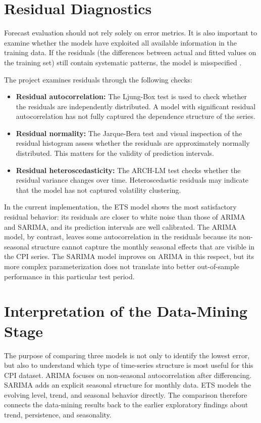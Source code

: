 \section{Residual Diagnostics}

Forecast evaluation should not rely solely on error metrics. It is also important to examine whether the models have exploited all available information in the training data. If the residuals (the differences between actual and fitted values on the training set) still contain systematic patterns, the model is misspecified \cite{Box2015,Hyndman2021}.

The project examines residuals through the following checks:

\begin{itemize}
	\item \textbf{Residual autocorrelation:} The Ljung-Box test is used to check whether the residuals are independently distributed. A model with significant residual autocorrelation has not fully captured the dependence structure of the series.
	\item \textbf{Residual normality:} The Jarque-Bera test and visual inspection of the residual histogram assess whether the residuals are approximately normally distributed. This matters for the validity of prediction intervals.
	\item \textbf{Residual heteroscedasticity:} The ARCH-LM test checks whether the residual variance changes over time. Heteroscedastic residuals may indicate that the model has not captured volatility clustering.
\end{itemize}

In the current implementation, the ETS model shows the most satisfactory residual behavior: its residuals are closer to white noise than those of ARIMA and SARIMA, and its prediction intervals are well calibrated. The ARIMA model, by contrast, leaves some autocorrelation in the residuals because its non-seasonal structure cannot capture the monthly seasonal effects that are visible in the CPI series. The SARIMA model improves on ARIMA in this respect, but its more complex parameterization does not translate into better out-of-sample performance in this particular test period.

\section{Interpretation of the Data-Mining Stage}

The purpose of comparing three models is not only to identify the lowest error, but also to understand which type of time-series structure is most useful for this CPI dataset. ARIMA focuses on non-seasonal autocorrelation after differencing. SARIMA adds an explicit seasonal structure for monthly data. ETS models the evolving level, trend, and seasonal behavior directly. The comparison therefore connects the data-mining results back to the earlier exploratory findings about trend, persistence, and seasonality.

